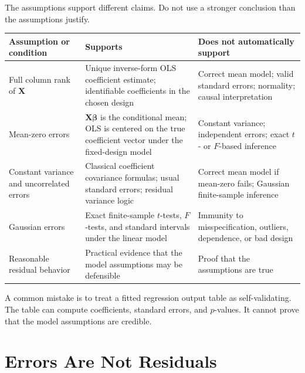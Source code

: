 The assumptions support different claims.  Do not use a stronger conclusion than the assumptions justify.

\begin{center}
\begin{tabular}{>{\raggedright\arraybackslash}p{}>{\raggedright\arraybackslash}p{}>{\raggedright\arraybackslash}p{}}
\toprule
\textbf{Assumption or condition} & \textbf{Supports} & \textbf{Does not automatically support} \\
\midrule
Full column rank of \(\mathbf{X}\) & Unique inverse-form OLS coefficient estimate; identifiable coefficients in the chosen design & Correct mean model; valid standard errors; normality; causal interpretation \\
Mean-zero errors & \(\mathbf{X}\boldsymbol{\beta}\) is the conditional mean; OLS is centered on the true coefficient vector under the fixed-design model & Constant variance; independent errors; exact \(t\)- or \(F\)-based inference \\
Constant variance and uncorrelated errors & Classical coefficient covariance formulas; usual standard errors; residual variance logic & Correct mean model if mean-zero fails; Gaussian finite-sample inference \\
Gaussian errors & Exact finite-sample \(t\)-tests, \(F\)-tests, and standard intervals under the linear model & Immunity to misspecification, outliers, dependence, or bad design \\
Reasonable residual behavior & Practical evidence that the model assumptions may be defensible & Proof that the assumptions are true \\
\bottomrule
\end{tabular}
\end{center}

A common mistake is to treat a fitted regression output table as self-validating.  The table can compute coefficients, standard errors, and \(p\)-values.  It cannot prove that the model assumptions are credible.

\section{Errors Are Not Residuals}

